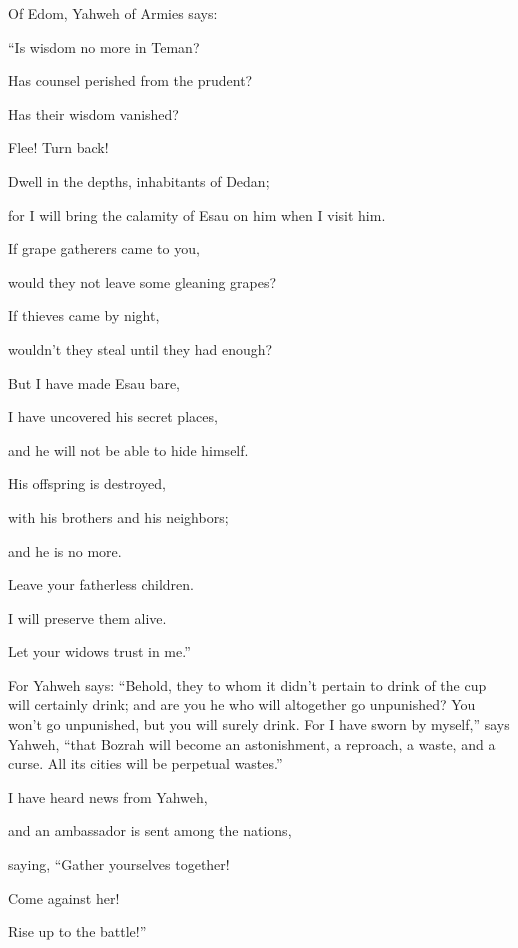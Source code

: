 {\par }{\BB \par }{\PP {}Of Edom, Yahweh of Armies says:
\par }{\Q “Is wisdom no more in Teman?
\par }{\QB Has counsel perished from the prudent?
\par }{\QB Has their wisdom vanished?
\par }{\Q {}Flee! Turn back!
\par }{\QB Dwell in the depths, inhabitants of Dedan;
\par }{\QB for I will bring the calamity of Esau on him when I visit him.
\par }{\Q {}If grape gatherers came to you,
\par }{\QB would they not leave some gleaning grapes?
\par }{\Q If thieves came by night,
\par }{\QB wouldn’t they steal until they had enough?
\par }{\Q {}But I have made Esau bare,
\par }{\QB I have uncovered his secret places,
\par }{\QB and he will not be able to hide himself.
\par }{\Q His offspring is destroyed,
\par }{\QB with his brothers and his neighbors;
\par }{\QB and he is no more.
\par }{\Q {}Leave your fatherless children.
\par }{\QB I will preserve them alive.
\par }{\QB Let your widows trust in me.”
\par }{\PP {}For Yahweh says: “Behold, they to whom it didn’t pertain to drink of the cup will certainly drink; and are you he who will altogether go unpunished? You won’t go unpunished, but you will surely drink.
For I have sworn by myself,” says Yahweh, “that Bozrah will become an astonishment, a reproach, a waste, and a curse. All its cities will be perpetual wastes.”
\par }{\Q {}I have heard news from Yahweh,
\par }{\QB and an ambassador is sent among the nations,
\par }{\Q saying, “Gather yourselves together!
\par }{\QB Come against her!
\par }{\QB Rise up to the battle!”
}
